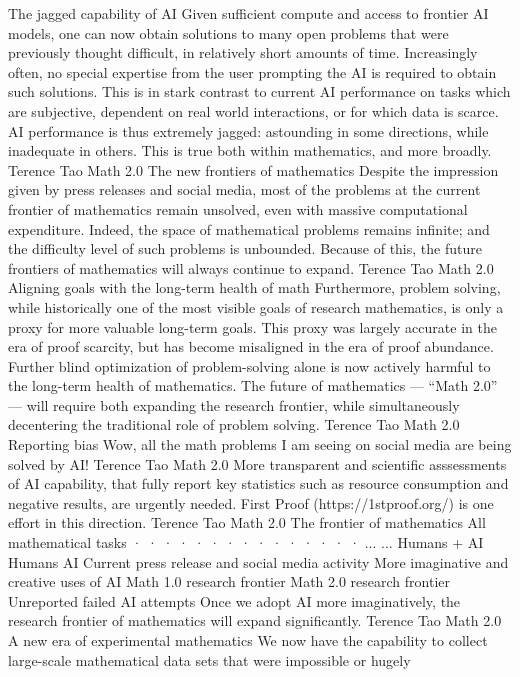The jagged capability of AI
Given sufficient compute and access to frontier AI models,
one can now obtain solutions to many open problems that
were previously thought difficult, in relatively short amounts
of time.
Increasingly often, no special expertise from the user
prompting the AI is required to obtain such solutions.
This is in stark contrast to current AI performance on
tasks which are subjective, dependent on real world
interactions, or for which data is scarce.
AI performance is thus extremely jagged: astounding in
some directions, while inadequate in others. This is true
both within mathematics, and more broadly.
Terence Tao
Math 2.0
The new frontiers of mathematics
Despite the impression given by press releases and social
media, most of the problems at the current frontier of
mathematics remain unsolved, even with massive
computational expenditure.
Indeed, the space of mathematical problems remains
infinite; and the difficulty level of such problems is
unbounded.
Because of this, the future frontiers of mathematics will
always continue to expand.
Terence Tao
Math 2.0
Aligning goals with the long-term health of math
Furthermore, problem solving, while historically one of the
most visible goals of research mathematics, is only a proxy
for more valuable long-term goals.
This proxy was largely accurate in the era of proof scarcity,
but has become misaligned in the era of proof abundance.
Further blind optimization of problem-solving alone is now
actively harmful to the long-term health of mathematics.
The future of mathematics — “Math 2.0” — will require both
expanding the research frontier, while simultaneously
decentering the traditional role of problem solving.
Terence Tao
Math 2.0
Reporting bias
Wow, all the math problems I am seeing on social media are
being solved by AI!
Terence Tao
Math 2.0
More transparent and scientific asssessments of AI
capability, that fully report key statistics such as resource
consumption and negative results, are urgently needed.
First Proof (https://1stproof.org/) is one effort in
this direction.
Terence Tao
Math 2.0
The frontier of mathematics
All mathematical tasks
· · ·
· · ·
· · ·
· · ·
· · ·
...
...
Humans + AI
Humans
AI
Current press release
and social media activity
More imaginative and
creative uses of AI
Math 1.0
research frontier
Math 2.0
research frontier
Unreported failed
AI attempts
Once we adopt AI more imaginatively, the research frontier of
mathematics will expand significantly.
Terence Tao
Math 2.0
A new era of experimental mathematics
We now have the capability to collect large-scale
mathematical data sets that were impossible or hugely
